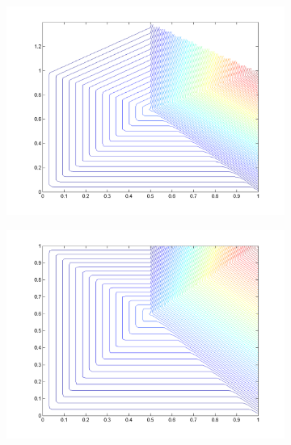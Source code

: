 \begin{figure}
\label{fig::2D_PWL_pentagon_basis_functions_contour}
\centering
	\begin{subfigure}[b]{0.48\textwidth}
		\centering
		\includegraphics[width=\textwidth]{figures/sec_BF/PWL_rpent_contour_A.png}
		\caption{}
	\end{subfigure}
	\hfill
	\begin{subfigure}[b]{0.48\textwidth}
		\centering
		\includegraphics[width=\textwidth]{figures/sec_BF/PWL_dpent_contour_A.png}
		\caption{}
	\end{subfigure}
	\vfill
	\begin{subfigure}[b]{0.48\textwidth}
		\centering

\end{subfigure}
\end{figure}
